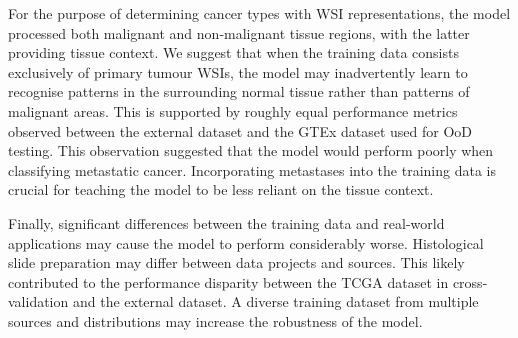 \documentclass{l4proj}
\begin{document}
For the purpose of determining cancer types with WSI representations, the model processed both malignant and non-malignant tissue regions, with the latter providing tissue context. We suggest that when the training data consists exclusively of primary tumour WSIs, the model may inadvertently learn to recognise patterns in the surrounding normal tissue rather than patterns of malignant areas. This is supported by roughly equal performance metrics observed between the external dataset and the GTEx dataset used for OoD testing. This observation suggested that the model would perform poorly when classifying metastatic cancer. Incorporating metastases into the training data is crucial for teaching the model to be less reliant on the tissue context.

Finally, significant differences between the training data and real-world applications may cause the model to perform considerably worse. Histological slide preparation may differ between data projects and sources. This likely contributed to the performance disparity between the TCGA dataset in cross-validation and the external dataset. A diverse training dataset from multiple sources and distributions may increase the robustness of the model.
\end{document}
